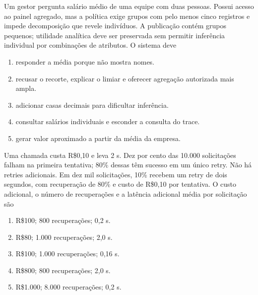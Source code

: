 \TextoBase
Um gestor pergunta salário médio de uma equipe com duas pessoas. Possui acesso ao painel agregado, mas a política exige grupos com pelo menos cinco registros e impede decomposição que revele indivíduos.
A publicação contém grupos pequenos; utilidade analítica deve ser preservada sem permitir inferência individual por combinações de atributos.
\FonteDidatica
\Comando O sistema deve
\begin{enumerate}[label=\Alph*)]
\item responder a média porque não mostra nomes.
\item recusar o recorte, explicar o limiar e oferecer agregação autorizada mais ampla.
\item adicionar casas decimais para dificultar inferência.
\item consultar salários individuais e esconder a consulta do trace.
\item gerar valor aproximado a partir da média da empresa.
\end{enumerate}

\TextoBase
Uma chamada custa R\$0,10 e leva 2 s. Dez por cento das 10.000 solicitações falham na primeira tentativa; 80\% dessas têm sucesso em um único retry. Não há retries adicionais.
Em dez mil solicitações, 10\% recebem um retry de dois segundos, com recuperação de 80\% e custo de R\$0,10 por tentativa.
\FonteDidatica
\Comando O custo adicional, o número de recuperações e a latência adicional média por solicitação são
\begin{enumerate}[label=\Alph*)]
\item R\$100; 800 recuperações; 0,2 s.
\item R\$80; 1.000 recuperações; 2,0 s.
\item R\$100; 1.000 recuperações; 0,16 s.
\item R\$800; 800 recuperações; 2,0 s.
\item R\$1.000; 8.000 recuperações; 0,2 s.
\end{enumerate}

